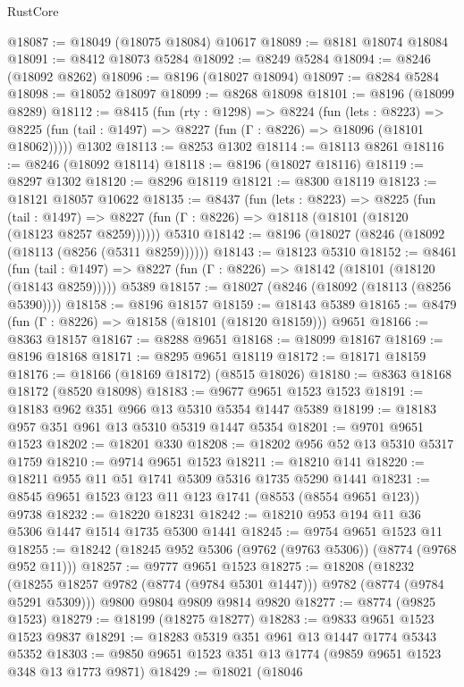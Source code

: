 \begin{lexlean}{RustCore}
\begin{coremodule}
@18087 := @18049 (@18075 @18084) @10617
@18089 := @8181 @18074 @18084
@18091 := @8412 @18073 @5284
@18092 := @8249 @5284
@18094 := @8246 (@18092 @8262)
@18096 := @8196 (@18027 @18094)
@18097 := @8284 @5284
@18098 := @18052 @18097
@18099 := @8268 @18098
@18101 := @8196 (@18099 @8289)
@18112 := @8415
    (fun (rty : @1298) =>
    @8224
      (fun (lets : @8223) =>
      @8225 (fun (tail : @1497) => @8227 (fun (Γ : @8226) => @18096 (@18101 @18062)))))
    @1302
@18113 := @8253 @1302
@18114 := @18113 @8261
@18116 := @8246 (@18092 @18114)
@18118 := @8196 (@18027 @18116)
@18119 := @8297 @1302
@18120 := @8296 @18119
@18121 := @8300 @18119
@18123 := @18121 @18057 @10622
@18135 := @8437
    (fun (lets : @8223) =>
    @8225
      (fun (tail : @1497) =>
      @8227 (fun (Γ : @8226) => @18118 (@18101 (@18120 (@18123 @8257 @8259))))))
    @5310
@18142 := @8196 (@18027 (@8246 (@18092 (@18113 (@8256 (@5311 @8259))))))
@18143 := @18123 @5310
@18152 := @8461
    (fun (tail : @1497) => @8227 (fun (Γ : @8226) => @18142 (@18101 (@18120 (@18143 @8259)))))
    @5389
@18157 := @18027 (@8246 (@18092 (@18113 (@8256 @5390))))
@18158 := @8196 @18157
@18159 := @18143 @5389
@18165 := @8479 (fun (Γ : @8226) => @18158 (@18101 (@18120 @18159))) @9651
@18166 := @8363 @18157
@18167 := @8288 @9651
@18168 := @18099 @18167
@18169 := @8196 @18168
@18171 := @8295 @9651 @18119
@18172 := @18171 @18159
@18176 := @18166 (@18169 @18172) (@8515 @18026)
@18180 := @8363 @18168 @18172 (@8520 @18098)
@18183 := @9677 @9651 @1523 @1523
@18191 := @18183 @962 @351 @966 @13 @5310 @5354 @1447 @5389
@18199 := @18183 @957 @351 @961 @13 @5310 @5319 @1447 @5354
@18201 := @9701 @9651 @1523
@18202 := @18201 @330
@18208 := @18202 @956 @52 @13 @5310 @5317 @1759
@18210 := @9714 @9651 @1523
@18211 := @18210 @141
@18220 := @18211 @955 @11 @51 @1741 @5309 @5316 @1735 @5290 @1441
@18231 := @8545 @9651 @1523 @123 @11 @123 @1741 (@8553 (@8554 @9651 @123)) @9738
@18232 := @18220 @18231
@18242 := @18210 @953 @194 @11 @36 @5306 @1447 @1514 @1735 @5300 @1441
@18245 := @9754 @9651 @1523 @11
@18255 := @18242 (@18245 @952 @5306 (@9762 (@9763 @5306)) (@8774 (@9768 @952 @11)))
@18257 := @9777 @9651 @1523
@18275 := @18208
    (@18232 (@18255 @18257 @9782 (@8774 (@9784 @5301 @1447))) @9782 (@8774 (@9784 @5291 @5309)))
    @9800
    @9804
    @9809
    @9814
    @9820
@18277 := @8774 (@9825 @1523)
@18279 := @18199 (@18275 @18277)
@18283 := @9833 @9651 @1523 @1523 @9837
@18291 := @18283 @5319 @351 @961 @13 @1447 @1774 @5343 @5352
@18303 := @9850 @9651 @1523 @351 @13 @1774 (@9859 @9651 @1523 @348 @13 @1773 @9871)
@18429 := @18021
    (@18046

\end{coremodule}
\end{lexlean}
